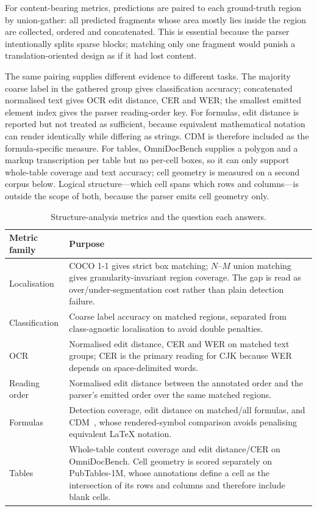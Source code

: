 For content-bearing metrics, predictions are paired to each ground-truth region
by union-gather: all predicted fragments whose area mostly lies inside the
region are collected, ordered and concatenated. This is essential because the
parser intentionally splits sparse blocks; matching only one fragment would
punish a translation-oriented design as if it had lost content.

The same pairing supplies different evidence to different tasks. The majority
coarse label in the gathered group gives classification accuracy; concatenated
normalised text gives OCR edit distance, CER and WER; the smallest emitted
element index gives the parser reading-order key. For formulas, edit distance is
reported but not treated as sufficient, because equivalent mathematical notation
can render identically while differing as strings. CDM is therefore included as
the formula-specific measure. For tables, OmniDocBench supplies a polygon and a
markup transcription per table but no per-cell boxes, so it can only support
whole-table coverage and text accuracy; cell geometry is measured on a second
corpus below. Logical structure---which cell spans which rows and columns---is
outside the scope of both, because the parser emits cell geometry only.

\begin{table}[H]
\centering
\caption{Structure-analysis metrics and the question each answers.}
\label{tab:structure-metrics}
\small
\setlength{\tabcolsep}{5pt}
\begin{tabularx}{\textwidth}{@{}l >{\raggedright\arraybackslash}X@{}}
\toprule
\textbf{Metric family} & \textbf{Purpose} \\
\midrule
Localisation & COCO 1-1 gives strict box matching; $N$--$M$ union matching gives
granularity-invariant region coverage. The gap is read as over/under-segmentation
cost rather than plain detection failure. \\
Classification & Coarse label accuracy on matched regions, separated from
class-agnostic localisation to avoid double penalties. \\
OCR & Normalised edit distance, CER and WER on matched text groups; CER is the
primary reading for CJK because WER depends on space-delimited words. \\
Reading order & Normalised edit distance between the annotated order and the
parser's emitted order over the same matched regions. \\
Formulas & Detection coverage, edit distance on matched/all formulas, and
CDM~\citep{cdm}, whose rendered-symbol comparison avoids penalising equivalent
LaTeX notation. \\
Tables & Whole-table content coverage and edit distance/CER on OmniDocBench.
Cell geometry is scored separately on PubTables-1M, whose annotations define a
cell as the intersection of its rows and columns and therefore include blank
cells. \\
\bottomrule
\end{tabularx}
\end{table}

